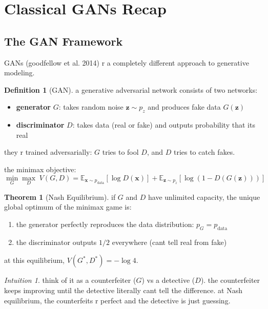 \documentclass[11pt,a4paper]{article}
\theoremstyle{definition}
\newtheorem{definition}{Definition}[section]
\newtheorem{theorem}{Theorem}[section]
\theoremstyle{remark}
\newtheorem*{intuition}{Intuition}
\begin{document}
\section{Classical GANs Recap}

\subsection{The GAN Framework}

GANs (goodfellow et al. 2014) r a completely different approach to generative modeling.

\begin{definition}[GAN]
a generative adversarial network consists of two networks:
\begin{itemize}[nosep]
    \item \textbf{generator} $G$: takes random noise $\mathbf{z} \sim p_z$ and produces fake data $G(\mathbf{z})$
    \item \textbf{discriminator} $D$: takes data (real or fake) and outputs probability that its real
\end{itemize}
they r trained adversarially: $G$ tries to fool $D$, and $D$ tries to catch fakes.
\end{definition}

the minimax objective:
\[
\min_G \max_D \; V(G, D) = \mathbb{E}_{\mathbf{x} \sim p_{\text{data}}}[\log D(\mathbf{x})] + \mathbb{E}_{\mathbf{z} \sim p_z}[\log(1 - D(G(\mathbf{z})))]
\]

\begin{theorem}[Nash Equilibrium]
if $G$ and $D$ have unlimited capacity, the unique global optimum of the minimax game is:
\begin{enumerate}[nosep]
    \item the generator perfectly reproduces the data distribution: $p_G = p_{\text{data}}$
    \item the discriminator outputs $1/2$ everywhere (cant tell real from fake)
\end{enumerate}
at this equilibrium, $V(G^*, D^*) = -\log 4$.
\end{theorem}

\begin{intuition}
think of it as a counterfeiter ($G$) vs a detective ($D$). the counterfeiter keeps improving until the detective literally cant tell the difference. at Nash equilibrium, the counterfeits r perfect and the detective is just guessing.
\end{intuition}
\end{document}
